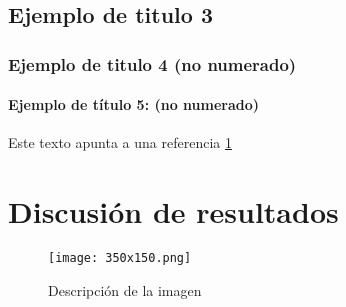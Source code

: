          \subsection{Ejemplo de titulo 3}
            \lipsum[1]
         \subsubsection{Ejemplo de titulo 4 (no numerado)}
            \lipsum[1]
            \paragraph{Ejemplo de título 5: (no numerado)}
               \lipsum[1]

      Este texto apunta a una referencia \ref{imagendesc}

      \section{Discusión de resultados}
         \lipsum[1-2]
         \begin{figure}[h]
            \centering
            \texttt{[image: 350x150.png]}
            \caption{Descripción de la imagen}
            \label{imagendesc}
         \end{figure}


